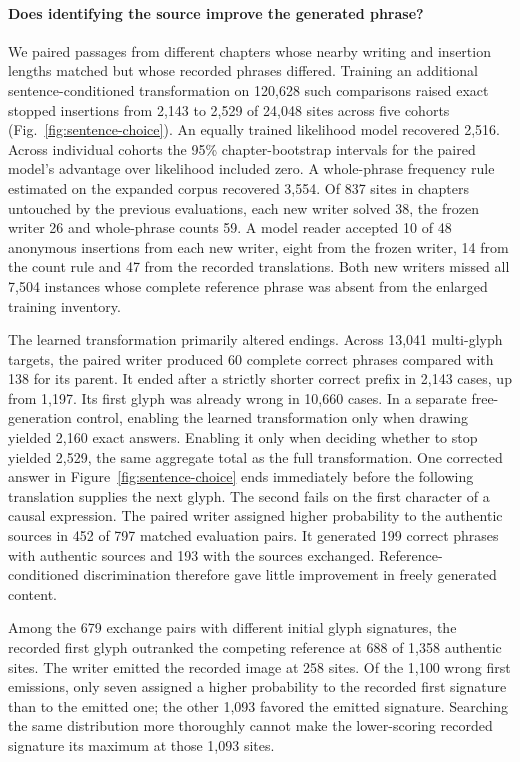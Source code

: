\documentclass[12pt,a4paper]{article}
\providecommand{\DIFadd}[1]{{\protect\color{blue} \sf #1}} %
\begin{document}
\paragraph{\DIFadd{Does identifying the source improve the generated phrase?}}
\DIFadd{We paired passages from different chapters whose nearby writing and insertion lengths matched but whose recorded phrases differed. Training an additional sentence-conditioned transformation on 120,628 such comparisons raised exact stopped insertions from 2,143 to 2,529 of 24,048 sites across five cohorts (Fig.~\ref{fig:sentence-choice}). An equally trained likelihood model recovered 2,516. Across individual cohorts the 95\% chapter-bootstrap intervals for the paired model's advantage over likelihood included zero. A whole-phrase frequency rule estimated on the expanded corpus recovered 3,554. Of 837 sites in chapters untouched by the previous evaluations, each new writer solved 38, the frozen writer 26 and whole-phrase counts 59. A model reader accepted 10 of 48 anonymous insertions from each new writer, eight from the frozen writer, 14 from the count rule and 47 from the recorded translations. Both new writers missed all 7,504 instances whose complete reference phrase was absent from the enlarged training inventory.
}

\DIFadd{The learned transformation primarily altered endings. Across 13,041 multi-glyph targets, the paired writer produced 60 complete correct phrases compared with 138 for its parent. It ended after a strictly shorter correct prefix in 2,143 cases, up from 1,197. Its first glyph was already wrong in 10,660 cases. In a separate free-generation control, enabling the learned transformation only when drawing yielded 2,160 exact answers. Enabling it only when deciding whether to stop yielded 2,529, the same aggregate total as the full transformation. One corrected answer in Figure~\ref{fig:sentence-choice} ends immediately before the following translation supplies the next glyph. The second fails on the first character of a causal expression. The paired writer assigned higher probability to the authentic sources in 452 of 797 matched evaluation pairs. It generated 199 correct phrases with authentic sources and 193 with the sources exchanged. Reference-conditioned discrimination therefore gave little improvement in freely generated content.
}

\DIFadd{Among the 679 exchange pairs with different initial glyph signatures, the recorded first glyph outranked the competing reference at 688 of 1,358 authentic sites. The writer emitted the recorded image at 258 sites. Of the 1,100 wrong first emissions, only seven assigned a higher probability to the recorded first signature than to the emitted one; the other 1,093 favored the emitted signature. Searching the same distribution more thoroughly cannot make the lower-scoring recorded signature its maximum at those 1,093 sites.
}
\end{document}

